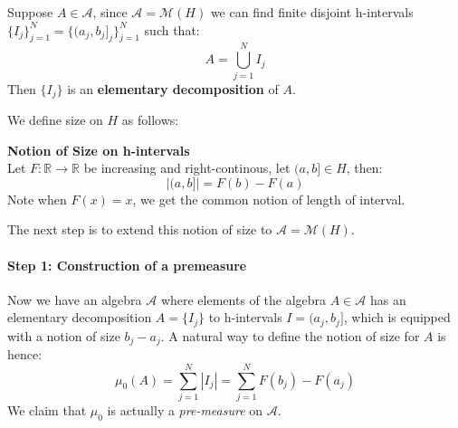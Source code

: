 \begin{definition}Suppose $A\in \mathcal A$, since $\mathcal A=\mathcal M(H)$ we can find finite disjoint h-intervals $\{I_j\}_{j=1}^N=\{(a_j,b_j]_j\}_{j=1}^N$ such that:
\begin{equation}
A=\bigcup_{j=1}^N I_j
\end{equation}
Then $\{I_j\}$ is an \textbf{elementary decomposition} of $A$.

\end{definition}We define size on $H$ as follows:

\begin{framed}
\textbf{Notion of Size on h-intervals}\\
Let $F:\mathbb{R}\to\mathbb{R}$ be increasing and right-continous, let $(a,b]\in H$, then:
\begin{equation}
|(a,b]|=F(b)-F(a)
\end{equation}
Note when $F(x)=x$, we get the common notion of length of interval.
\end{framed}

The next step is to extend this notion of size to $\mathcal A=\mathcal M(H)$.

\paragraph{Step 1: Construction of a premeasure}

Now we have an algebra $\mathcal A$ where elements of the algebra $A\in \mathcal A$ has an elementary decomposition $A=\{I_j\}$ to h-intervals $I=(a_j,b_j]$, which is equipped with a notion of size $b_j -a_j$. A natural way to define the notion of size for $A$ is hence:
\begin{equation}
\mu_0(A) = \sum_{j=1}^N |I_j| =\sum_{j=1}^N F(b_j)-F(a_j)
\end{equation}
We claim that $\mu_0$ is actually a \textit{pre-measure} on $\mathcal A$.

